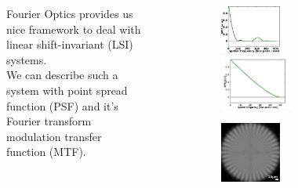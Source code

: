 \documentclass{beamer}
\begin{document}
\begin{frame}
	\begin{columns}
		\begin{column}{0.5\textwidth}
			\begin{figure}
			Fourier Optics provides us nice framework to deal with linear shift-invariant (LSI) systems. 
			\\	
			We can describe such a system with point spread function (PSF) and it's Fourier transform modulation transfer function (MTF). 
			\\
			\end{figure}
		\end{column}
		\begin{column}{0.5\textwidth}
			\begin{figure}
				\includegraphics[width=0.5\textwidth]{images/MTF-example.png}
				\includegraphics[width=0.6\textwidth]{images/MTF-perfect.png}
			\end{figure}
			\begin{figure}
				\includegraphics[width=0.5\textwidth]{images/Spoke.png}

\end{figure}
\end{column}
\end{columns}
\end{frame}
\end{document}
